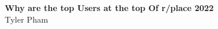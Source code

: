 \documentclass[a4paper,12pt]{article}
\begin{document}
\pagestyle{fancy}
\thispagestyle{empty}
\renewcommand*{\thefootnote}{\fnsymbol{footnote}}
\begin{center}
\Large{\textbf{Why are the top Users at the top Of r/place 2022}}
\vspace{0.1cm}
\normalsize
\\ Tyler Pham \\
\vspace{0.1cm}
\medskip
\normalsize
\end{center}
\vspace{0.1cm}

\vspace{0.1cm}

\end{document}
